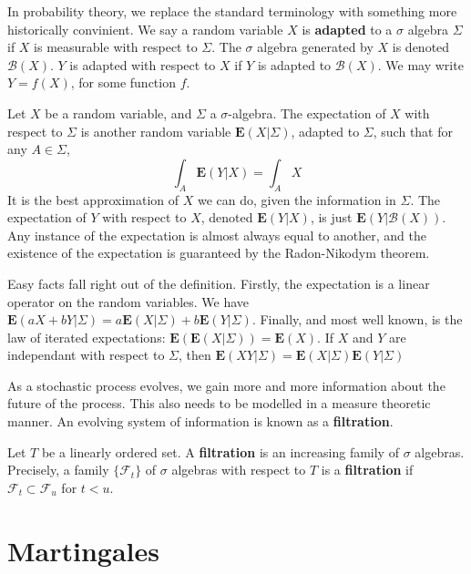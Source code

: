 In probability theory, we replace the standard terminology with something more historically convinient. We say a random variable $X$ is {\bf adapted} to a $\sigma$ algebra $\Sigma$ if $X$ is measurable with respect to $\Sigma$. The $\sigma$ algebra generated by $X$ is denoted $\mathcal{B}(X)$. $Y$ is adapted with respect to $X$ if $Y$ is adapted to $\mathcal{B}(X)$. We may write $Y = f(X)$, for some function $f$.

\begin{definition}
    Let $X$ be a random variable, and $\Sigma$ a $\sigma$-algebra. The expectation of $X$ with respect to $\Sigma$ is another random variable $\mathbf{E}(X|\Sigma)$, adapted to $\Sigma$, such that for any $A \in \Sigma$,
    \[ \int_A \mathbf{E}(Y|X) = \int_A X \]
    It is the best approximation of $X$ we can do, given the information in $\Sigma$. The expectation of $Y$ with respect to $X$, denoted $\mathbf{E}(Y|X)$, is just $\mathbf{E}(Y|\mathcal{B}(X))$. Any instance of the expectation is almost always equal to another, and the existence of the expectation is guaranteed by the Radon-Nikodym theorem.
\end{definition}

Easy facts fall right out of the definition. Firstly, the expectation is a linear operator on the random variables. We have $\mathbf{E}(aX + bY | \Sigma) = a \mathbf{E}(X | \Sigma) + b \mathbf{E}(Y | \Sigma)$. Finally, and most well known, is the law of iterated expectations: $\mathbf{E}(\mathbf{E}(X | \Sigma)) = \mathbf{E}(X)$. If $X$ and $Y$ are independant with respect to $\Sigma$, then $\mathbf{E}(XY | \Sigma) = \mathbf{E}(X|\Sigma) \mathbf{E}(Y|\Sigma)$

As a stochastic process evolves, we gain more and more information about the future of the process. This also needs to be modelled in a measure theoretic manner. An evolving system of information is known as a {\bf filtration}.

\begin{definition}
    Let $T$ be a linearly ordered set. A {\bf filtration} is an increasing family of $\sigma$ algebras. Precisely, a family $\{ \mathcal{F}_t \}$ of $\sigma$ algebras with respect to $T$ is a {\bf filtration} if $\mathcal{F}_t \subset \mathcal{F}_u$ for $t < u$.
\end{definition}

\section{Martingales}

